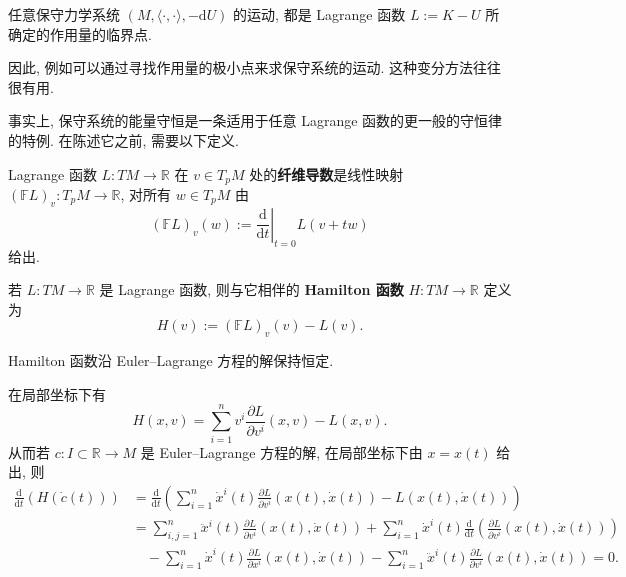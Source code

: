 \begin{RiemannCorollary}\label{cor:conservative-motion-as-critical-action}
任意保守力学系统 $(M,\langle\cdot,\cdot\rangle,-\mathrm{d}U)$ 的运动, 都是 Lagrange 函数 $L:=K-U$ 所确定的作用量的临界点.
\end{RiemannCorollary}

因此, 例如可以通过寻找作用量的极小点来求保守系统的运动. 这种变分方法往往很有用.

事实上, 保守系统的能量守恒是一条适用于任意 Lagrange 函数的更一般的守恒律的特例. 在陈述它之前, 需要以下定义.

\begin{RiemannDefinition}\label{def:fiber-derivative-of-lagrangian}
Lagrange 函数 $L:TM\to\mathbb{R}$ 在 $v\in T_pM$ 处的\textbf{纤维导数}是线性映射 $(\mathbb{F}L)_v:T_pM\to\mathbb{R}$, 对所有 $w\in T_pM$ 由
\[
  (\mathbb{F}L)_v(w):=\left.\frac{\mathrm{d}}{\mathrm{d}t}\right|_{t=0}L(v+tw)
\]
给出.
\end{RiemannDefinition}

\begin{RiemannDefinition}\label{def:hamiltonian-associated-to-lagrangian}
若 $L:TM\to\mathbb{R}$ 是 Lagrange 函数, 则与它相伴的 \textbf{Hamilton 函数} $H:TM\to\mathbb{R}$ 定义为
\[
  H(v):=(\mathbb{F}L)_v(v)-L(v).
\]
\end{RiemannDefinition}

\begin{RiemannTheorem}\label{thm:hamiltonian-conserved-along-euler-lagrange-flow}
Hamilton 函数沿 Euler–Lagrange 方程的解保持恒定.
\end{RiemannTheorem}

\begin{RiemannProof}
在局部坐标下有
\[
  H(x,v)=\sum_{i=1}^n v^i\frac{\partial L}{\partial v^i}(x,v)-L(x,v).
\]
从而若 $c:I\subset\mathbb{R}\to M$ 是 Euler–Lagrange 方程的解, 在局部坐标下由 $x=x(t)$ 给出, 则
\begin{align*}
  \frac{\mathrm{d}}{\mathrm{d}t}(H(\dot c(t)))
  &=\frac{\mathrm{d}}{\mathrm{d}t}
    \left(\sum_{i=1}^n\dot x^i(t)\frac{\partial L}{\partial v^i}(x(t),\dot x(t))
       - L(x(t),\dot x(t))\right)\\
  &=\sum_{i,j=1}^n\ddot x^i(t)\frac{\partial L}{\partial v^i}(x(t),\dot x(t))
    +\sum_{i=1}^n\dot x^i(t)\frac{\mathrm{d}}{\mathrm{d}t}
       \left(\frac{\partial L}{\partial v^i}(x(t),\dot x(t))\right)\\
  &\quad-\sum_{i=1}^n\dot x^i(t)\frac{\partial L}{\partial x^i}(x(t),\dot x(t))
     -\sum_{i=1}^n\ddot x^i(t)\frac{\partial L}{\partial v^i}(x(t),\dot x(t))=0.
\end{align*}
\end{RiemannProof}

